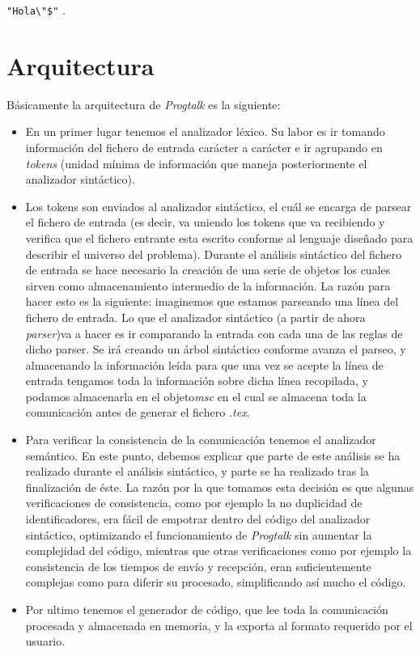 \documentclass[12pt,a4paper]{report}
\begin{document}

\verb~"Hola\"$"~ .


\section{Arquitectura}

Básicamente la arquitectura de \textit{Progtalk} es la siguiente:
\begin{itemize}
\item En un primer lugar tenemos el analizador léxico. Su labor es ir tomando información del fichero de entrada carácter a carácter e ir agrupando en \textit{tokens} (unidad mínima de información que maneja posteriormente el analizador sintáctico).
\item Los tokens son enviados al analizador sintáctico, el cuál se encarga de parsear el fichero de entrada (es decir, va uniendo los tokens que va recibiendo y verifica que el fichero entrante esta escrito conforme al lenguaje diseñado para describir el universo del problema).
Durante el análisis sintáctico del fichero de entrada se hace necesario la creación de una serie de objetos los cuales sirven como almacenamiento intermedio de la información. La razón para hacer esto es la siguiente: imaginemos que estamos parseando una línea del fichero de entrada. Lo que el analizador sintáctico (a partir de ahora \textit{parser})va a hacer es ir comparando la entrada con cada una de las reglas de dicho parser. Se irá creando un árbol sintáctico conforme avanza el parseo, y almacenando la información leída para que una vez se acepte la línea de entrada tengamos toda la información sobre dicha línea recopilada, y podamos almacenarla en el objeto\textit{msc} en el cual se almacena toda la comunicación antes de generar el fichero \textit{.tex}.

\item Para verificar la consistencia de la comunicación tenemos el analizador semántico. En este punto, debemos explicar que parte de este análisis se ha realizado durante el análisis sintáctico, y parte se ha realizado tras la finalización de éste. La razón por la que tomamos esta decisión es que algunas verificaciones de consistencia, como por ejemplo la no duplicidad de identificadores, era fácil de empotrar dentro del código del analizador sintáctico, optimizando el funcionamiento de \textit{Progtalk} sin aumentar la complejidad del código, mientras que otras verificaciones como por ejemplo la consistencia de los tiempos de envío y recepción, eran suficientemente complejas como para diferir su procesado, simplificando así mucho el código.
\item Por ultimo tenemos el generador de código, que lee toda la comunicación procesada y almacenada en memoria, y la exporta al formato requerido por el usuario.
\end{itemize}
\end{document}
